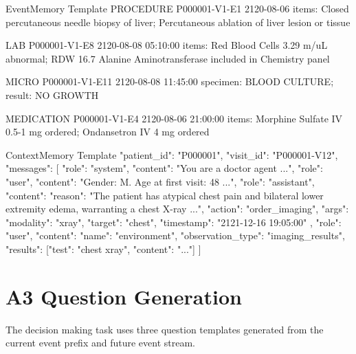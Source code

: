 \begin{promptblock}{EventMemory Template}
PROCEDURE  P000001-V1-E1  2120-08-06
  items: Closed percutaneous needle biopsy of liver;
         Percutaneous ablation of liver lesion or tissue

LAB        P000001-V1-E8  2120-08-08 05:10:00
  items: Red Blood Cells 3.29 m/uL abnormal; RDW 16.7%
         Alanine Aminotransferase included in Chemistry panel

MICRO      P000001-V1-E11 2120-08-08 11:45:00
  specimen: BLOOD CULTURE; result: NO GROWTH

MEDICATION P000001-V1-E4  2120-08-06 21:00:00
  items: Morphine Sulfate IV 0.5-1 mg ordered;
         Ondansetron IV 4 mg ordered
\end{promptblock}

\begin{promptblock}{ContextMemory Template}
{
  "patient_id": "P000001",
  "visit_id": "P000001-V12",
  "messages": [
    {"role": "system", "content": "You are a doctor agent ..."},
    {"role": "user", "content": "Gender: M. Age at first visit: 48 ..."},
    {"role": "assistant", "content": {
      "reason": "The patient has atypical chest pain and bilateral lower
                 extremity edema, warranting a chest X-ray ...",
      "action": "order_imaging",
      "args": {"modality": "xray", "target": "chest",
               "timestamp": "2121-12-16 19:05:00"}
    }},
    {"role": "user", "content": {
      "name": "environment",
      "observation_type": "imaging_results",
      "results": [{"test": "chest xray", "content": "..."}]
    }}
  ]
}
\end{promptblock}

\section*{A3 Question Generation}

The decision making task uses three question templates generated from the current event prefix and future event stream.

